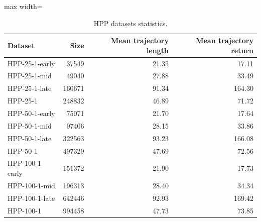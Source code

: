 \documentclass{article}
\begin{document}
\begin{table}[ht]
    \label{tab:hpp_stats}
    \begin{center}
        \caption{HPP datasets statistics.}
    \begin{small}
    \begin{adjustbox}{max width=\columnwidth}
		\begin{tabular}{l|rrr}
		\toprule
	\textbf{Dataset} & \textbf{Size} & \textbf{Mean trajectory length} & \textbf{Mean trajectory return}\\
\midrule
HPP-25-1-early & 37549 & 21.35 & 17.11\\
HPP-25-1-mid & 49040 & 27.88 & 33.49\\
HPP-25-1-late & 160671 & 91.34 & 164.30\\
HPP-25-1 & 248832 & 46.89 & 71.72\\
\midrule
HPP-50-1-early & 75071 & 21.70 & 17.64\\
HPP-50-1-mid & 97406 & 28.15 & 33.86\\
HPP-50-1-late & 322563 & 93.23 & 166.08\\
HPP-50-1 & 497329 & 47.69 & 72.56\\
\midrule
HPP-100-1-early & 151372 & 21.90 & 17.73\\
HPP-100-1-mid & 196313 & 28.40 & 34.34\\
HPP-100-1-late & 642446 & 92.93 & 169.42\\
HPP-100-1 & 994458 & 47.73 & 73.85\\
\bottomrule
\end{tabular}
        \end{adjustbox}
    \end{small}
    \end{center}
    \vskip -0.1in
\end{table}
\end{document}
